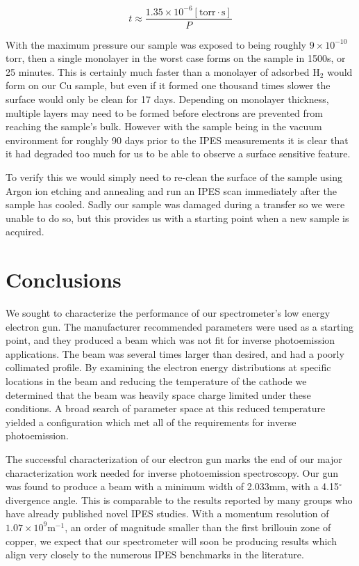\begin{equation}
    t\approx\frac{1.35\times10^{-6}[\mathrm{torr\cdot s}]}{P}
\end{equation}

With the maximum pressure our sample was exposed to being roughly $9\times10^{-10}$ torr, then a single monolayer in the worst case forms on the sample
in 1500s, or 25 minutes. This is certainly much faster than a monolayer of adsorbed H$_2$ would form on our Cu sample, but even if it formed one thousand 
times slower the surface would only be clean for 17 days. Depending on monolayer thickness, multiple layers may need to be formed before electrons are 
prevented from reaching the sample's bulk. However with the sample being in the vacuum environment for roughly 90 days prior to the IPES measurements it is clear 
that it had degraded too much for us to be able to observe a surface sensitive feature. 

To verify this we would simply need to re-clean the surface of the sample using Argon ion etching and annealing and run an IPES scan immediately 
after the sample has cooled. Sadly our sample was damaged during a transfer so we were unable to do so, but this provides us with a starting point 
when a new sample is acquired. 

\section{Conclusions}

We sought to characterize the performance of our spectrometer's low energy electron gun. The manufacturer recommended parameters were used 
as a starting point, and they produced a beam which was not fit for inverse photoemission applications. The beam was several times larger than 
desired, and had a poorly collimated profile. By examining the electron energy distributions at specific locations in the beam and reducing the 
temperature of the cathode we determined that the beam was heavily space charge limited under these conditions. A broad search of parameter space
at this reduced temperature yielded a configuration which met all of the requirements for inverse photoemission. 

The successful characterization of our electron gun marks the end of our major characterization work needed for inverse photoemission spectroscopy. 
Our gun was found to produce a beam with a minimum width of 2.033mm, with a 4.15$^\circ$ divergence angle. This is comparable to the results
reported by many groups who have already published novel IPES studies. With a momentum resolution of $1.07\times10^9\mathrm{m}^{-1}$, an order of 
magnitude smaller than the first brillouin zone of copper, we expect that our spectrometer will soon be producing results which align very closely 
to the numerous IPES benchmarks in the literature. 

